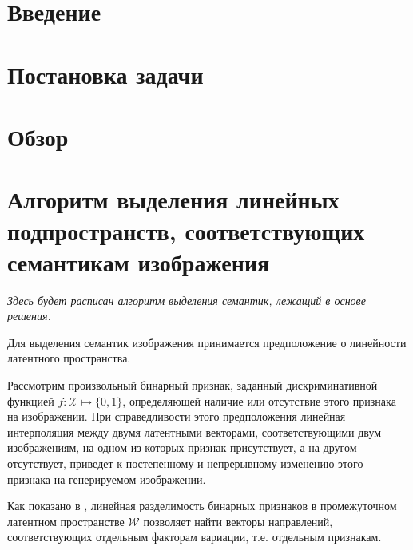 

\usepackage{caption}
\usepackage{listings}


\graphicspath{ {images/} }



\maketitle
\setcounter{tocdepth}{2}
\tableofcontents

\section*{Введение}


\section*{Постановка задачи}
\label{sec:task}


\section{Обзор}


\section{Алгоритм выделения линейных подпространств, соответствующих семантикам изображения}
\emph{Здесь будет расписан алгоритм выделения семантик, лежащий в основе решения.}

Для выделения семантик изображения принимается предположение о линейности латентного пространства.

Рассмотрим произвольный бинарный признак, заданный дискриминативной функцией $f : \mathcal X \mapsto \{0,1\}$, определяющей наличие или отсутствие этого признака на изображении.
При справедливости этого предположения линейная интерполяция между двумя латентными векторами, соответствующими двум изображениям, на одном из которых признак присутствует, а на другом --- отсутствует, приведет к постепенному и непрерывному изменению этого признака на генерируемом изображении. 

Как показано в \cite{StyleGAN}, линейная разделимость бинарных признаков в промежуточном латентном пространстве $\mathcal{W}$ позволяет найти векторы направлений, соответствующих отдельным факторам вариации, т.е. отдельным признакам.

